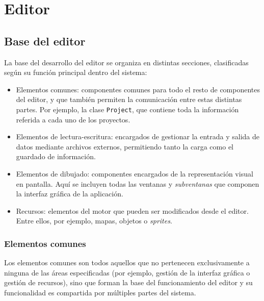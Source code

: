 \chapter{Editor}
\label{cap:editor}

\section{Base del editor}

La base del desarrollo del editor se organiza en distintas secciones, clasificadas según su función principal dentro del sistema:

\begin{itemize}
	\item Elementos comunes: componentes comunes para todo el resto de componentes del editor, y que también permiten la comunicación entre estas distintas partes. Por ejemplo, la clase \texttt{Project}, que contiene toda la información referida a cada uno de los proyectos.
	\item Elementos de lectura-escritura: encargados de gestionar la entrada y salida de datos mediante archivos externos, permitiendo tanto la carga como el guardado de información.
	\item Elementos de dibujado: componentes encargados de la representación visual en pantalla. Aquí se incluyen todas las ventanas y \textit{subventanas} que componen la interfaz gráfica de la aplicación.
	\item Recursos: elementos del motor que pueden ser modificados desde el editor. Entre ellos, por ejemplo, mapas, objetos o \textit{sprites}.
\end{itemize}

\subsection{Elementos comunes}
Los elementos comunes son todos aquellos que no pertenecen exclusivamente a ninguna de las áreas especificadas (por ejemplo, gestión de la interfaz gráfica o gestión de recursos), sino que forman la base del funcionamiento del editor y su funcionalidad es compartida por múltiples partes del sistema.

